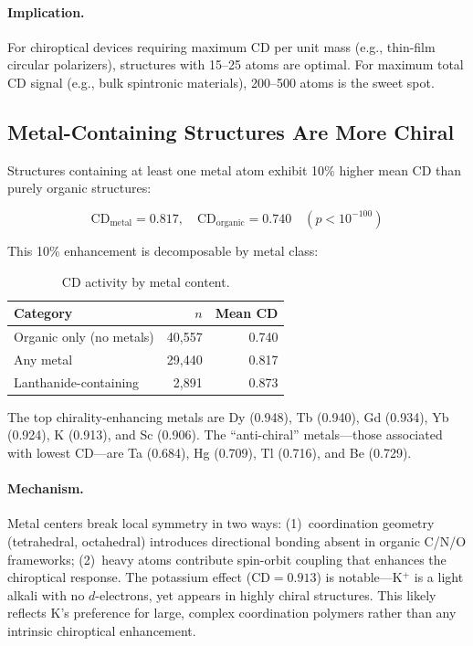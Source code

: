 \documentclass[11pt,a4paper]{article}
\begin{document}
\paragraph{Implication.} For chiroptical devices requiring maximum CD per unit mass (e.g., thin-film circular polarizers), structures with 15--25 atoms are optimal. For maximum total CD signal (e.g., bulk spintronic materials), 200--500 atoms is the sweet spot.

\subsection{Metal-Containing Structures Are More Chiral}

Structures containing at least one metal atom exhibit 10\% higher mean CD than purely organic structures:

\begin{equation}
\text{CD}_{\text{metal}} = 0.817, \quad \text{CD}_{\text{organic}} = 0.740 \quad (p < 10^{-100})
\end{equation}

\noindent This 10\% enhancement is decomposable by metal class:

\begin{table}[H]
\centering
\caption{CD activity by metal content.}
\label{tab:metals}
\begin{tabular}{lrr}
\toprule
Category & $n$ & Mean CD \\
\midrule
Organic only (no metals) & 40,557 & 0.740 \\
Any metal & 29,440 & 0.817 \\
Lanthanide-containing & 2,891 & 0.873 \\
\bottomrule
\end{tabular}
\end{table}

\noindent The top chirality-enhancing metals are Dy (0.948), Tb (0.940), Gd (0.934), Yb (0.924), K (0.913), and Sc (0.906). The ``anti-chiral'' metals---those associated with lowest CD---are Ta (0.684), Hg (0.709), Tl (0.716), and Be (0.729).

\paragraph{Mechanism.} Metal centers break local symmetry in two ways: (1)~coordination geometry (tetrahedral, octahedral) introduces directional bonding absent in organic C/N/O frameworks; (2)~heavy atoms contribute spin-orbit coupling that enhances the chiroptical response. The potassium effect ($\text{CD} = 0.913$) is notable---K$^+$ is a light alkali with no $d$-electrons, yet appears in highly chiral structures. This likely reflects K's preference for large, complex coordination polymers rather than any intrinsic chiroptical enhancement.
\end{document}
